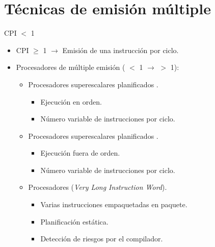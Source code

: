 \section{Técnicas de emisión múltiple}

\begin{frame}[t]{CPI $<$ 1}
\begin{itemize}
  \item CPI $\geq$ 1 $\rightarrow$ Emisión de una instrucción por ciclo.

  \item Procesadores de múltiple emisión 
        ( $<$ 1 $\rightarrow$  $>$ 1):
    \begin{itemize}
      \item Procesadores superescalares planificados .
        \begin{itemize}
          \item Ejecución en orden.
          \item Número variable de instrucciones por ciclo.
        \end{itemize}
      \item Procesadores superescalares planificados .
        \begin{itemize}
          \item Ejecución fuera de orden.
          \item Número variable de instrucciones por ciclo.
        \end{itemize}
      \item Procesadores  (\emph{Very Long Instruction Word}).
        \begin{itemize}
          \item Varias instrucciones empaquetadas en paquete.
          \item Planificación estática.
          \item Detección de riesgos por el compilador.
        \end{itemize}
    \end{itemize}
\end{itemize}
\end{frame}

